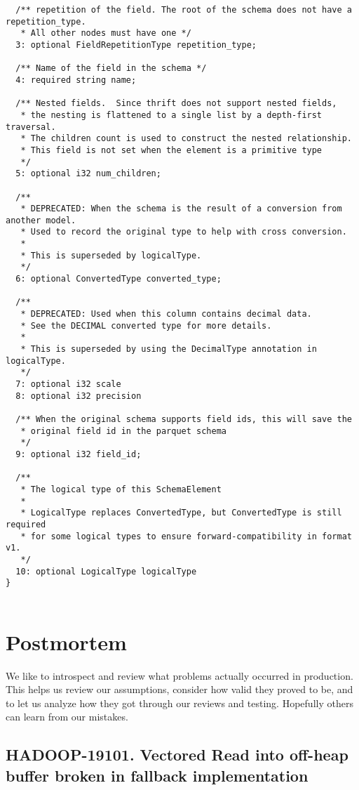 \documentclass[manuscript]{acmart}
\begin{document}
\begin{verbatim}
  /** repetition of the field. The root of the schema does not have a repetition_type.
   * All other nodes must have one */
  3: optional FieldRepetitionType repetition_type;

  /** Name of the field in the schema */
  4: required string name;

  /** Nested fields.  Since thrift does not support nested fields,
   * the nesting is flattened to a single list by a depth-first traversal.
   * The children count is used to construct the nested relationship.
   * This field is not set when the element is a primitive type
   */
  5: optional i32 num_children;

  /**
   * DEPRECATED: When the schema is the result of a conversion from another model.
   * Used to record the original type to help with cross conversion.
   *
   * This is superseded by logicalType.
   */
  6: optional ConvertedType converted_type;

  /**
   * DEPRECATED: Used when this column contains decimal data.
   * See the DECIMAL converted type for more details.
   *
   * This is superseded by using the DecimalType annotation in logicalType.
   */
  7: optional i32 scale
  8: optional i32 precision

  /** When the original schema supports field ids, this will save the
   * original field id in the parquet schema
   */
  9: optional i32 field_id;

  /**
   * The logical type of this SchemaElement
   *
   * LogicalType replaces ConvertedType, but ConvertedType is still required
   * for some logical types to ensure forward-compatibility in format v1.
   */
  10: optional LogicalType logicalType
}


\end{verbatim}

\section{Postmortem}\label{sec:postmortem}
We like to introspect and review what problems actually occurred
in production.
This helps us review our assumptions, consider how valid they proved
to be, and to let us analyze how they got through our reviews and testing.
Hopefully others can learn from our mistakes.


\subsection{HADOOP-19101. Vectored Read into off-heap buffer broken in fallback implementation}
\label{HADOOP-19101}
\end{document}
